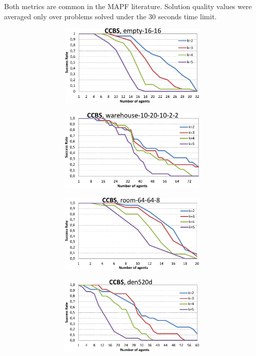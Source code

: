 \documentclass[review]{elsarticle}
\newcommand{\mapf}{\ac{MAPF}\xspace}
\begin{document}
Both metrics are common in the \mapf literature. Solution quality values were averaged only over problems solved under the 30 seconds time limit. 

\begin{figure}[t]
\centering
\begin{subfigure}
    \centering
    \begin{subfigure}
        \centering
        \includegraphics[width=0.45\linewidth]{mapfr-sr-plot-ccbs-empty.pdf}
    \end{subfigure}\hspace{0.025\linewidth}%
    \begin{subfigure}
        \centering
        \includegraphics[width=0.45\linewidth]{mapfr-sr-plot-ccbs-warehouse.pdf}
    \end{subfigure}
\end{subfigure}

\begin{subfigure}
    \centering
    \begin{subfigure}
        \centering
        \includegraphics[width=0.45\linewidth]{mapfr-sr-plot-ccbs-room.pdf}
    \end{subfigure}\hspace{0.025\linewidth}%
    \begin{subfigure}
        \centering
        \includegraphics[width=0.45\linewidth]{mapfr-sr-plot-ccbs-den520d.pdf}
    \end{subfigure}%
\end{subfigure}


\end{figure}
\end{document}
